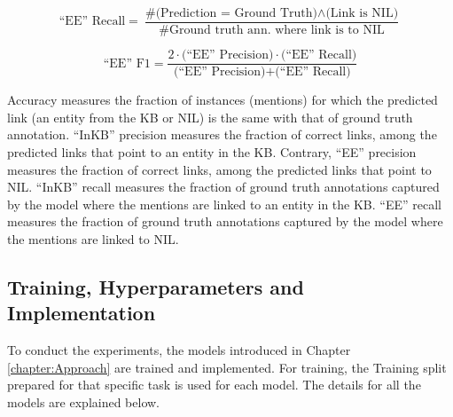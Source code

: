 \documentclass{report}
\theoremstyle{definition}
\theoremstyle{remark}
\begin{document}
\begin{fleqn}
\begin{equation}
    \text{``EE'' Recall} = \frac{\text{\# (Prediction = Ground Truth)} \land \text{(Link is NIL)}}{\text{\# Ground truth ann. where link is to NIL}}
\end{equation}
\end{fleqn}

\begin{fleqn}
\begin{equation}
    \text{``EE'' F1} = \frac{2 \cdot \text{(``EE'' Precision)} \cdot \text{(``EE'' Recall)}}{\text{(``EE'' Precision)} + \text{(``EE'' Recall)}}
\end{equation}
\end{fleqn}

Accuracy measures the fraction of instances (mentions) for which the predicted link (an entity from the KB or NIL) is the same with that of ground truth annotation. ``InKB'' precision measures the fraction of correct links, among the predicted links that point to an entity in the KB. Contrary, ``EE'' precision measures the fraction of correct links, among the predicted links that point to NIL. ``InKB'' recall measures the fraction of ground truth annotations captured by the model where the mentions are linked to an entity in the KB. ``EE'' recall measures the fraction of ground truth annotations captured by the model where the mentions are linked to NIL.


\subsection{Training, Hyperparameters and Implementation}
\label{sec:EvalExpSetupTraining}
To conduct the experiments, the models introduced in Chapter \ref{chapter:Approach} are trained and implemented. For training, the Training split prepared for that specific task is used for each model. The details for all the models are explained below.
\end{document}
